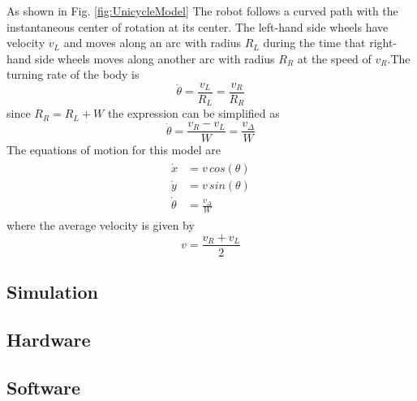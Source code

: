 As shown in Fig. \ref{fig:UnicycleModel} The robot follows a curved path with the instantaneous center of rotation at its center. The left-hand side wheels have velocity $v_L$ and moves along an arc with radius $R_L$ during the time that right-hand side wheels moves along another arc with radius $R_R$ at the speed of $v_R$.The turning rate of the body is
        \begin{equation*}
            \dot{\theta}= \frac{v_L}{R_L} = \frac{v_R}{R_R}
        \end{equation*}
        since $R_R = R_L + W$ the expression can be simplified as
        \begin{equation}
            \dot{\theta}= \frac{v_R - v_L}{W} = \frac{v_\Delta}{W}\label{eq:ThetaDot3}
        \end{equation}
        The equations of motion for this model are
        \begin{eqnarray}
            \begin{aligned}
                \dot{x} &= v\,cos(\theta)\\
                \dot{y} &= v\,sin(\theta)\\
                \dot{\theta} &= \frac{v_\Delta}{W}
            \end{aligned}
            \label{eq:MotionEq3}
        \end{eqnarray}
        where the average velocity\cite{Corke2011} is given by
        \begin{equation}
            v = \frac{v_R + v_L}{2} 
            \label{eq:av_velocity}
        \end{equation}{} 


\subsection{Simulation}

\subsection{Hardware}

\subsection{Software}
